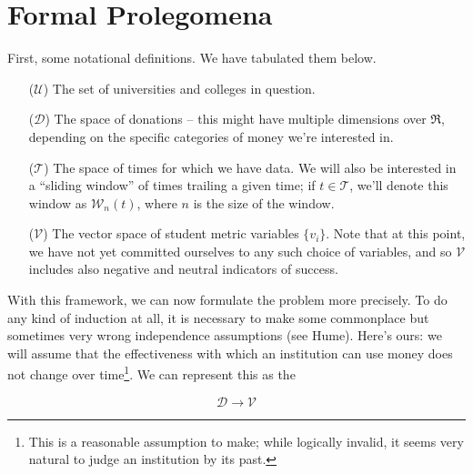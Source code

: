 \documentclass[paper.tex]{subfiles}
\newcommand{\U}{\mathcal{U}}
\newcommand{\D}{\mathcal{D}}
\newcommand{\V}{\mathcal{V}}
\newcommand{\T}{\mathcal{T}}
\newcommand{\W}{\mathcal{W}}
\begin{document}
	
	\section{Formal Prolegomena}
	
	First, some notational definitions. We have tabulated them below. 
	
	\begin{itemize}
		\item[($\U$)] The set of universities and colleges in question.
		\item[($\D$)] The space of donations -- this might have multiple dimensions over $\Re$, depending on the specific categories of money we're interested in. 
		\item[($\T$)] The space of times for which we have data. We will also be interested in a ``sliding window'' of times trailing a given time; if $t \in \T$, we'll denote this window as $\W_n(t)$, where $n$ is the size of the window.
		
		\item[($\V$)] The vector space of student metric variables $\{v_i\}$. Note that at this point, we have not yet committed ourselves to any such choice of variables, and so $\V$ includes also negative and neutral indicators of success.
	\end{itemize}
	
	With this framework, we can now formulate the problem more precisely. To do any kind of induction at all, it is necessary to make some commonplace but sometimes very wrong independence assumptions (see Hume). Here's ours: we will assume that the effectiveness with which an institution can use money does not change over time\footnote{This is a reasonable assumption to make; while logically invalid, it seems very natural to judge an institution by its past.}. We can represent this as the 
		
	\[ \D \to \V \]
\end{document}
